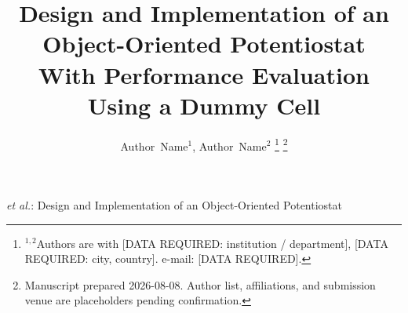 \documentclass[journal]{IEEEtran}
\begin{document}
\title{Design and Implementation of an Object-Oriented Potentiostat\\ With Performance Evaluation Using a Dummy Cell}

\author{Author~Name$^{1}$, Author~Name$^{2}$
\thanks{$^{1,2}$Authors are with [DATA REQUIRED: institution / department], [DATA REQUIRED: city, country]. e-mail: [DATA REQUIRED].}%
\thanks{Manuscript prepared 2026-08-08. Author list, affiliations, and submission venue are placeholders pending confirmation.}}

%
{\MakeLowercase{\textit{et al.}}: Design and Implementation of an Object-Oriented Potentiostat}

\maketitle
\end{document}
